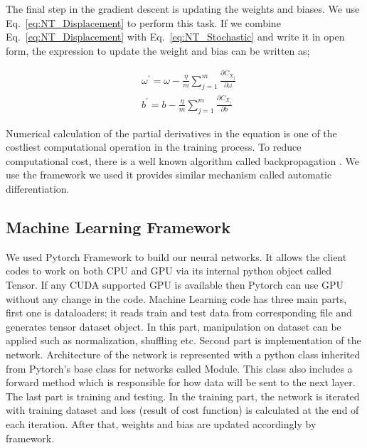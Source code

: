 \documentclass[a4paper,times,hidelinks,12pt]{article}
\begin{document}
The final step in the gradient descent is updating the weights and biases. We use Eq.~\eqref{eq:NT_Displacement} to perform this task. If we combine Eq.~\eqref{eq:NT_Displacement} with Eq.~\eqref{eq:NT_Stochastic} and write it in open form, the expression to update the weight and bias can be written as;

\begin{equation}
\label{eq:NT_weight_bias_update}
\begin{split}
& \omega^{\prime} = \omega - \frac{\eta}{m} \sum\limits_{j = 1}^{m} \frac{\partial{C_{X_j}}}{\partial{\omega}} \\
& b^{\prime} = b- \frac{\eta}{m} \sum\limits_{j = 1}^{m} \frac{\partial{C_{X_j}}}{\partial{b}}
\end{split}
\end{equation}

\noindent Numerical calculation of the partial derivatives in the equation is one of the costliest computational operation in the training process. To reduce computational cost, there is a well known algorithm called backpropagation \cite{goodfellow2016deep}. We use the framework we used it provides similar mechanism called automatic differentiation. 

\subsection{Machine Learning Framework}

We used Pytorch Framework \cite{paszke2017automatic} to build our neural networks. It allows the client codes to work on both CPU and GPU via its internal python object called Tensor. If any CUDA supported GPU is available then Pytorch can use GPU without any change in the code. Machine Learning code has three main parts, first one is dataloaders; it reads train and test data from corresponding file and generates tensor dataset object. In this part, manipulation on dataset can be applied such as normalization, shuffling etc. Second part is implementation of the network. Architecture of the network is represented with a python class inherited from Pytorch's base class for networks called Module. This class also includes a forward method which is responsible for how data will be sent to the next layer. The last part is training and testing. In the training part, the network is iterated with training dataset and loss (result of cost function) is calculated at the end of each iteration. After that, weights and bias are updated accordingly by framework.
\end{document}
